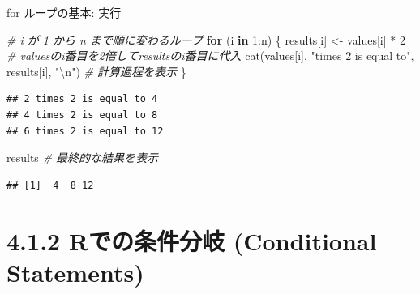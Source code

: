 \documentclass[
  ignorenonframetext,
]{beamer}
\newenvironment{Shaded}{\begin{snugshade}}{\end{snugshade}}
\newcommand{\CommentTok}[1]{\textcolor[rgb]{0.56,0.35,0.01}{\textit{#1}}}
\newcommand{\ControlFlowTok}[1]{\textcolor[rgb]{0.13,0.29,0.53}{\textbf{#1}}}
\newcommand{\DecValTok}[1]{\textcolor[rgb]{0.00,0.00,0.81}{#1}}
\newcommand{\FunctionTok}[1]{\textcolor[rgb]{0.00,0.00,0.00}{#1}}
\newcommand{\NormalTok}[1]{#1}
\newcommand{\OtherTok}[1]{\textcolor[rgb]{0.56,0.35,0.01}{#1}}
\newcommand{\SpecialCharTok}[1]{\textcolor[rgb]{0.00,0.00,0.00}{#1}}
\newcommand{\StringTok}[1]{\textcolor[rgb]{0.31,0.60,0.02}{#1}}
\begin{document}
\begin{frame}[fragile]{for ループの基本: 実行}
\protect\hypertarget{for-ux30ebux30fcux30d7ux306eux57faux672c-ux5b9fux884c}{}
\scriptsize

\begin{Shaded}
\begin{Highlighting}[]
\CommentTok{\# i が 1 から n まで順に変わるループ}
\ControlFlowTok{for}\NormalTok{ (i }\ControlFlowTok{in} \DecValTok{1}\SpecialCharTok{:}\NormalTok{n) \{}
\NormalTok{    results[i] }\OtherTok{\textless{}{-}}\NormalTok{ values[i] }\SpecialCharTok{*} \DecValTok{2} \CommentTok{\# valuesのi番目を2倍してresultsのi番目に代入}
    \FunctionTok{cat}\NormalTok{(values[i], }\StringTok{"times 2 is equal to"}\NormalTok{, results[i], }\StringTok{"}\SpecialCharTok{\textbackslash{}n}\StringTok{"}\NormalTok{) }\CommentTok{\# 計算過程を表示}
\NormalTok{\}}
\end{Highlighting}
\end{Shaded}

\begin{verbatim}
## 2 times 2 is equal to 4 
## 4 times 2 is equal to 8 
## 6 times 2 is equal to 12
\end{verbatim}

\begin{Shaded}
\begin{Highlighting}[]
\NormalTok{results }\CommentTok{\# 最終的な結果を表示}
\end{Highlighting}
\end{Shaded}

\begin{verbatim}
## [1]  4  8 12
\end{verbatim}

\normalsize
\end{frame}

\hypertarget{rux3067ux306eux6761ux4ef6ux5206ux5c90-conditional-statements}{%
\section{4.1.2 Rでの条件分岐 (Conditional
Statements)}\label{rux3067ux306eux6761ux4ef6ux5206ux5c90-conditional-statements}}
\end{document}
